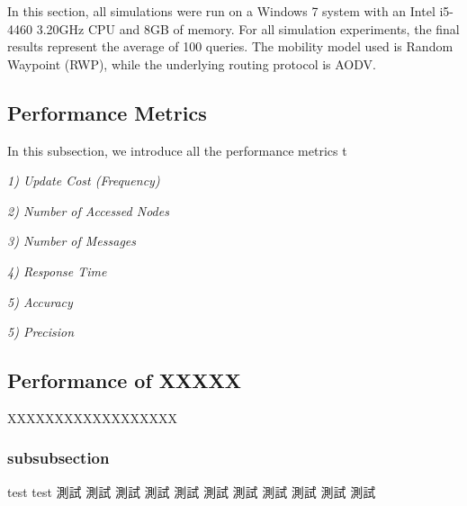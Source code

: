 In this section, all simulations were run on a Windows 7 system with an Intel i5-4460 3.20GHz CPU and 8GB of memory. For all simulation experiments, the final results represent the average of 100 queries. The mobility model used is Random Waypoint (RWP), while the underlying routing protocol is AODV.

\subsection{Performance Metrics}
In this subsection, we introduce all the performance metrics t

\emph{1) Update Cost (Frequency)}\\
\indent



\emph{2) Number of Accessed Nodes}\\
\indent


\emph{3) Number of Messages}\\
\indent


\emph{4) Response Time}\\
\indent


\emph{5) Accuracy}\\
\indent


\emph{5) Precision}\\
\indent


\subsection{Performance of XXXXX}
XXXXXXXXXXXXXXXXXX

\subsubsection{subsubsection}
test test 測試 測試 測試 測試 測試 測試 測試 測試 測試 測試 測試



\clearpage
